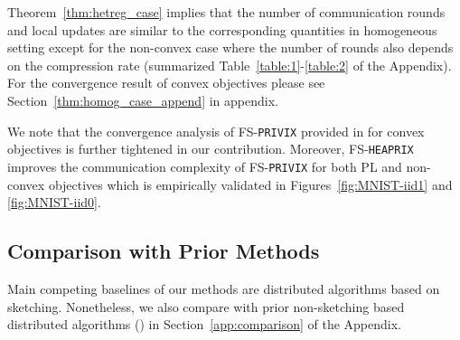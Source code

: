 \documentclass[sigconf, anonymous, review]{acmart}
\begin{document}

Theorem~\ref{thm:hetreg_case} implies that the number of communication rounds and local updates are similar to the corresponding quantities in homogeneous setting except for the non-convex case where the number of  rounds also depends on the compression rate (summarized Table~\ref{table:1}-\ref{table:2} of the Appendix). For the convergence result of convex objectives please see Section~\ref{thm:homog_case_append} in appendix.


{
We note that the convergence analysis of FS-\texttt{PRIVIX} provided in \citep{li2019privacy} for convex objectives is further tightened in our contribution. 
Moreover, FS-\texttt{HEAPRIX} improves the communication complexity of FS-\texttt{PRIVIX} for both PL and non-convex objectives which is empirically validated in Figures~\ref{fig:MNIST-iid1} and \ref{fig:MNIST-iid0}.
}


\subsection{Comparison with Prior Methods} 

Main competing baselines of our methods are distributed algorithms based on sketching. 
Nonetheless, we also compare with prior non-sketching based distributed algorithms (\citep{karimireddy2019scaffold,basu2019qsparse,reisizadeh2020fedpaq,haddadpour2020federated}) in Section~\ref{app:comparison} of the Appendix.
\end{document}
